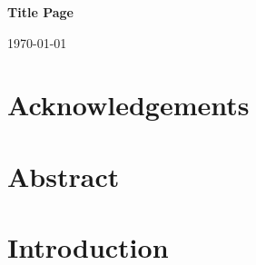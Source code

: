 \documentclass[11pt,a4paper,oneside]{book}
\title{}
\author{Jonathan Coney}
\date{}
\newcommand{\detailtexcount}[1]{%
  \immediate\write18{texcount -merge -sum -q #1.tex output.bbl > #1.wcdetail }%
}
\begin{document}
\onehalfspacing


\begin{titlepage}
\begin{center}
\Huge

\textbf{Title Page}

\vfill

\Large
\today

\end{center}
\end{titlepage}

\setcounter{page}{2}


\chapter*{Acknowledgements}


\chapter*{Abstract}

\newpage



\setcounter{tocdepth}{2}

\tableofcontents

\chapter{Introduction}



\printbibliography
\end{document}
